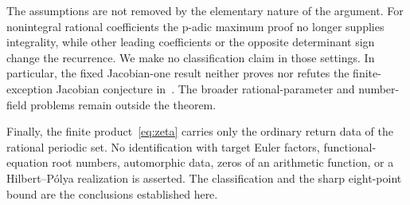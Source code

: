 The assumptions are not removed by the elementary nature of the
argument. For nonintegral rational coefficients the p-adic maximum
proof no longer supplies integrality, while other leading coefficients
or the opposite determinant sign change the recurrence. We make no
classification claim in those settings. In particular, the fixed
Jacobian-one result neither proves nor refutes the finite-exception
Jacobian conjecture in~\cite[Section 11]{dehenon2024problems}.
The broader rational-parameter and number-field problems remain
outside the theorem.

Finally, the finite product~\eqref{eq:zeta} carries only the ordinary
return data of the rational periodic set. No identification with target
Euler factors, functional-equation root numbers, automorphic data,
zeros of an arithmetic function, or a Hilbert--P\'olya realization is
asserted. The classification and the sharp eight-point bound are the
conclusions established here.
